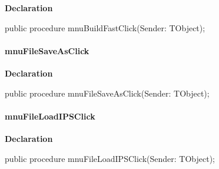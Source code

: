 \documentclass{report}
\newif\ifpdf
\begin{document}
\label{editor.TFrmEditor-mnuBuildFastClick}
\begin{list}{}{
\setlength{\itemindent}{0cm}
\setlength{\listparindent}{0cm}
\setlength{\leftmargin}{\evensidemargin}
\addtolength{\leftmargin}{\tmplength}
\settowidth{\labelsep}{X}
\addtolength{\leftmargin}{\labelsep}
\setlength{\labelwidth}{\tmplength}
}
\item[\textbf{Declaration}\hfill]
\ifpdf
\begin{flushleft}
\fi
\begin{ttfamily}
public procedure mnuBuildFastClick(Sender: TObject);\end{ttfamily}

\ifpdf
\end{flushleft}
\fi

\end{list}
\paragraph*{mnuFileSaveAsClick}\hspace*{\fill}

\label{editor.TFrmEditor-mnuFileSaveAsClick}
\begin{list}{}{
\setlength{\itemindent}{0cm}
\setlength{\listparindent}{0cm}
\setlength{\leftmargin}{\evensidemargin}
\addtolength{\leftmargin}{\tmplength}
\settowidth{\labelsep}{X}
\addtolength{\leftmargin}{\labelsep}
\setlength{\labelwidth}{\tmplength}
}
\item[\textbf{Declaration}\hfill]
\ifpdf
\begin{flushleft}
\fi
\begin{ttfamily}
public procedure mnuFileSaveAsClick(Sender: TObject);\end{ttfamily}

\ifpdf
\end{flushleft}
\fi

\end{list}
\paragraph*{mnuFileLoadIPSClick}\hspace*{\fill}

\label{editor.TFrmEditor-mnuFileLoadIPSClick}
\begin{list}{}{
\setlength{\itemindent}{0cm}
\setlength{\listparindent}{0cm}
\setlength{\leftmargin}{\evensidemargin}
\addtolength{\leftmargin}{\tmplength}
\settowidth{\labelsep}{X}
\addtolength{\leftmargin}{\labelsep}
\setlength{\labelwidth}{\tmplength}
}
\item[\textbf{Declaration}\hfill]
\ifpdf
\begin{flushleft}
\fi
\begin{ttfamily}
public procedure mnuFileLoadIPSClick(Sender: TObject);\end{ttfamily}

\ifpdf
\end{flushleft}
\fi

\end{list}
\end{document}
